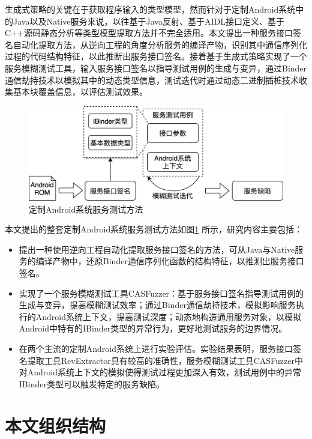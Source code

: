 \documentclass[winfonts,master,twoside]{njuthesis}
\begin{document}
生成式策略的关键在于获取程序输入的类型模型，然而针对于定制Android系统中的Java以及Native服务来说，以往基于Java反射\cite{iannillo2017chizpurfle}、基于AIDL接口定义\cite{gu2016exploiting}、基于C++源码静态分析\cite{liu2020fans}等类型模型提取方法并不完全适用。本文提出一种服务接口签名自动化提取方法，从逆向工程的角度分析服务的编译产物，识别其中通信序列化过程的代码结构特征，以此推断出服务接口签名。接着基于生成式策略实现了一个服务模糊测试工具，输入服务接口签名以指导测试用例的生成与变异，通过Binder通信劫持技术以模拟其中的动态类型信息，测试迭代时通过动态二进制插桩技术收集基本块覆盖信息，以评估测试效果。

\begin{figure}
	\centering
	\includegraphics[width=\textwidth]{figure/overview.png}
	\caption{定制Android系统服务测试方法}
	\label{overview}
\end{figure}

本文提出的整套定制Android系统服务测试方法如图\ref{overview} 所示，研究内容主要包括：
\begin{itemize}
    \item 提出一种使用逆向工程自动化提取服务接口签名的方法，可从Java与Native服务的编译产物中，还原Binder通信序列化函数的结构特征，以推测出服务接口签名。
    \item 实现了一个服务模糊测试工具CASFuzzer：基于服务接口签名指导测试用例的生成与变异，提高模糊测试效率；通过Binder通信劫持技术，模拟影响服务执行的Android系统上下文，提高测试深度；动态地构造通用服务对象，以模拟Android中特有的IBinder类型的异常行为，更好地测试服务的边界情况。
    \item 在两个主流的定制Android系统上进行实验评估。实验结果表明，服务接口签名提取工具RevExtractor具有较高的准确性，服务模糊测试工具CASFuzzer中对Android系统上下文的模拟使得测试过程更加深入有效，测试用例中的异常IBinder类型可以触发特定的服务缺陷。
\end{itemize}



\section{本文组织结构}
\end{document}
